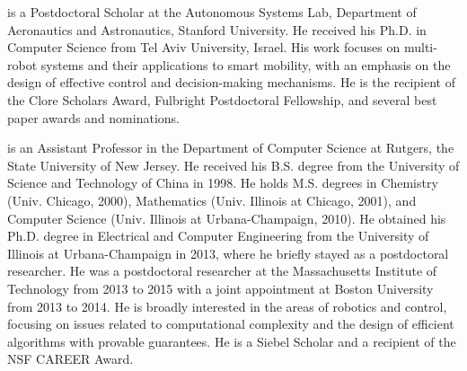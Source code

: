 \vspace{0.2in}

 is a Postdoctoral Scholar at the Autonomous Systems Lab, Department of Aeronautics and Astronautics, Stanford University. He received his Ph.D. in Computer Science from Tel Aviv University, Israel. His work focuses on multi-robot systems and their applications to smart mobility, with an emphasis on the design of effective control and decision-making mechanisms. He is the recipient of the Clore Scholars Award, Fulbright Postdoctoral Fellowship, and several best paper awards and nominations. 

\vspace{0.2in}

 is an Assistant Professor in the Department of Computer Science at Rutgers, the State University of New Jersey. He received his B.S. degree from the University of Science and Technology of China in 1998. He holds M.S. degrees in Chemistry (Univ. Chicago, 2000), Mathematics (Univ. Illinois at Chicago, 2001), and Computer Science (Univ. Illinois at Urbana-Champaign, 2010). He obtained his Ph.D. degree in Electrical and Computer Engineering from the University of Illinois at Urbana-Champaign in 2013, where he briefly stayed as a postdoctoral researcher. He was a postdoctoral researcher at the Massachusetts Institute of Technology from 2013 to 2015 with a joint appointment at Boston University from 2013 to 2014. He is broadly interested in the areas of robotics and control, focusing on issues related to computational complexity and the design of efficient algorithms with provable guarantees. He is a Siebel Scholar and a recipient of the NSF CAREER Award.

